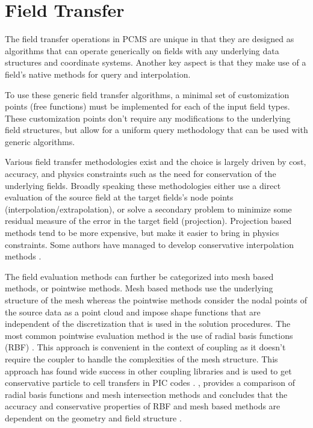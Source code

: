 \documentclass[12pt]{article}
\begin{document}
\section{Field Transfer} \label{sec:field_transfer}
The field transfer operations in PCMS are unique in that they are designed as algorithms that can operate generically on fields with any underlying data structures and coordinate systems. Another key aspect is that they make use of a field's native methods for query and interpolation.

To use these generic field transfer algorithms, a minimal set of customization points (free functions) must be implemented for each of the input field types. These customization points don't require any modifications to the underlying field structures, but allow for a uniform query methodology that can be used with generic algorithms.

Various field transfer methodologies exist and the choice is largely driven by cost, accuracy, and physics constraints such as the need for conservation of the underlying fields. Broadly speaking these methodologies either use a direct evaluation of the source field at the target fields's node points (interpolation/extrapolation), or solve a secondary problem to minimize some residual measure of the error in the target field (projection). Projection based methods tend to be more expensive, but make it easier to bring in physics constraints. Some authors have managed to develop conservative interpolation methods \cite{alauzetParallelMatrixfreeConservative2016}.

The field evaluation methods can further be categorized into mesh based methods, or pointwise methods. Mesh based methods use the underlying structure of the mesh whereas the pointwise methods consider the nodal points of the source data as a point cloud and impose shape functions that are independent of the discretization that is used in the solution procedures. The most common pointwise evaluation method is the use of radial basis functions (RBF) \cite{slatteryMeshfreeDataTransfer2016}. This approach is convenient in the context of coupling as it doesn't require the coupler to handle the complexities of the mesh structure. This approach has found wide success in other coupling libraries and is used to get conservative particle to cell transfers in PIC codes \cite{bungartzPreCICEFullyParallel2016,mollenImplementationHigherorderVelocity2021}. , provides a comparison of radial basis functions and mesh intersection methods and concludes that the accuracy and conservative properties of RBF and mesh based methods are dependent on the geometry and field structure \cite{slatteryMeshfreeDataTransfer2016}.
\end{document}
